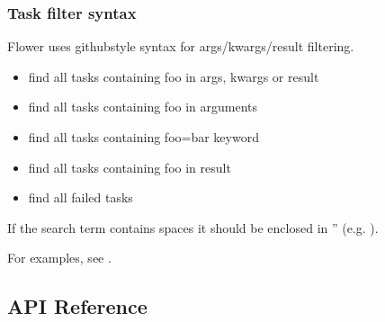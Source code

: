 \documentclass[letterpaper,10pt,english]{sphinxmanual}
\begin{document}
\subsubsection{Task filter syntax}
\label{\detokenize{tasks_filter:task-filter-syntax}}
Flower uses github\sphinxhyphen{}style syntax for args/kwargs/result filtering.
\begin{itemize}
\item {} 
 find all tasks containing foo in args, kwargs or result

\item {} 
 find all tasks containing foo in arguments

\item {} 
 find all tasks containing foo=bar keyword

\item {} 
 find all tasks containing foo in result

\item {} 
 find all failed tasks

\end{itemize}

If the search term contains spaces it should be enclosed in ” (e.g. ).

For examples, see .


\subsection{API Reference}
\label{\detokenize{api:api-reference}}\label{\detokenize{api::doc}}
\end{document}

